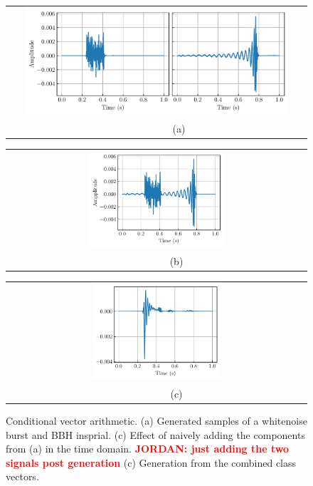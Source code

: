 \documentclass[12pt]{iopart}
\newcommand{\jordan}[1]{\textbf{\textcolor{red}{JORDAN: #1}}}
\begin{document}
\begin{figure}
  \centering
  \begin{tabular}[b]{c}
    \includegraphics[width=0.9\textwidth]{figures/wn+bbh.pdf} \\
    \small ~~~~~~~~~(a)
  \end{tabular} %
  \begin{tabular}[b]{c}
    \includegraphics[width=0.46\textwidth]{figures/ambient_result.pdf} \\
    \small ~~~~~~~~(b)
  \end{tabular}
 \begin{tabular}[b]{c}
    \includegraphics[width=0.44\textwidth]{figures/arithmetic_result.pdf} \\
    \small ~~~~~~~~(c)
  \end{tabular}
  \caption{Conditional vector arithmetic. (a) Generated samples of a whitenoise burst and BBH insprial. (c) Effect of naively adding the components from (a) in the time domain. \jordan{just adding the two signals post generation} (c) Generation from the combined class vectors. }
  \label{fig:arithmetic}
\end{figure}
\end{document}
